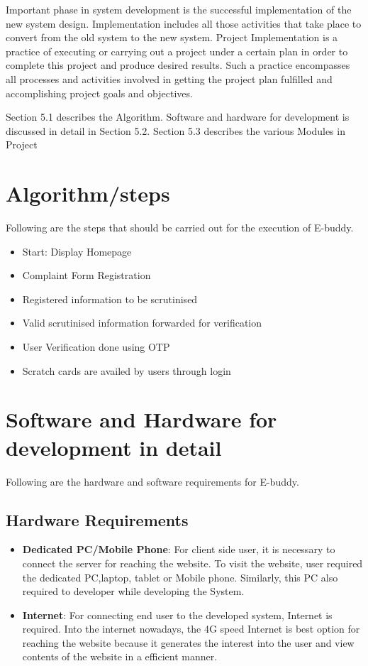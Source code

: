 Important phase in system development is the successful implementation of the new system
design. Implementation includes all those activities that take place to convert from the old
system to the new system. Project Implementation is a practice of executing or carrying
out a project under a certain plan in order to complete this project and produce desired
results. Such a practice encompasses all processes and activities involved in getting the
project plan fulfilled and accomplishing project goals and objectives. 

Section 5.1 describes
the Algorithm. Software and hardware for development is discussed in detail in Section 5.2.
Section 5.3 describes the various Modules in Project

\section {Algorithm/steps}
Following are the steps that should be carried out for the execution of E-buddy.
\begin{itemize}
\item Start: Display Homepage
\item Complaint Form Registration
\item Registered information to be scrutinised
\item Valid scrutinised information forwarded for verification
\item User Verification done using OTP
\item Scratch cards are availed by users through login
\end{itemize}

\section {Software and Hardware for development in detail}
Following are the hardware and software requirements for E-buddy.
\subsection {Hardware Requirements}
\begin{itemize}
\item \textbf {Dedicated PC/Mobile Phone}: For client side user, it is necessary to connect the
server for reaching the website. To visit the website, user required the dedicated PC,laptop, tablet or Mobile phone. Similarly, this PC also required to developer while
developing the System.
\item \textbf {Internet}: For connecting end user to the developed system, Internet is required. Into
the internet nowadays, the 4G speed Internet is best option for reaching the website
because it generates the interest into the user and view contents of the website in a
efficient manner.
\end {itemize}


